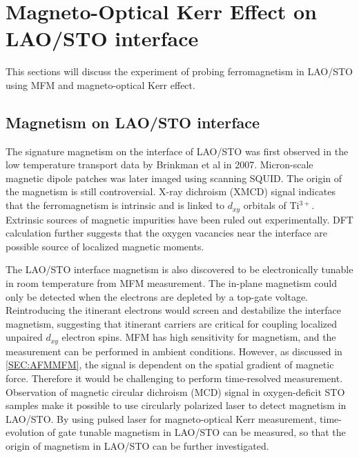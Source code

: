 \documentclass[pdflatex, sectionletters, 12pt]{pittetd}    %
\begin{document}
\chapter{Magneto-Optical Kerr Effect on LAO/STO interface}
\label{SEC:Kerr}

This sections will discuss the experiment of probing ferromagnetism in LAO/STO using MFM and magneto-optical Kerr effect. 

\section{Magnetism on LAO/STO interface}

The signature magnetism on the interface of LAO/STO was first observed in the low temperature transport data by Brinkman et al in 2007\cite{brinkman2007magnetic}. Micron-scale magnetic dipole patches was later imaged using scanning SQUID\cite{bert2011direct, kalisky2012scanning, kalisky2012critical}. The origin of the magnetism is still controversial. X-ray dichroism (XMCD) signal indicates that the ferromagnetism is intrinsic and is linked to $d_{xy}$ orbitals of Ti$^{3+}$\cite{lee2013titanium}. Extrinsic sources of magnetic impurities have been ruled out experimentally\cite{brinkman2007magnetic, lee2013titanium, ariando2011electronic}. DFT calculation further suggests that the oxygen vacancies near the interface are possible source of localized magnetic moments\cite{pentcheva2006charge}. 

The LAO/STO interface magnetism is also discovered to be electronically tunable in room temperature from MFM measurement\cite{bi2014room}. The in-plane magnetism could only be detected when the electrons are depleted by a top-gate voltage. Reintroducing the itinerant electrons would screen and destabilize the interface magnetism, suggesting that itinerant carriers are critical for coupling localized unpaired $d_{xy}$ electron spins\cite{fidkowski2013magnetic, Joshua2013gate, banerjee2013ferromagnetic}. MFM has high sensitivity for magnetism, and the measurement can be performed in ambient conditions. However, as discussed in \ref{SEC:AFMMFM}, the signal is dependent on the spatial gradient of magnetic force. Therefore it would be challenging to perform time-resolved measurement. Observation of magnetic circular dichroism (MCD) signal in oxygen-deficit STO samples\cite{rice2014persistent} make it possible to use circularly polarized laser to detect magnetism in LAO/STO. By using pulsed laser for magneto-optical Kerr measurement, time-evolution of gate tunable magnetism in LAO/STO can be measured, so that the origin of magnetism in LAO/STO can be further investigated.
\end{document}
